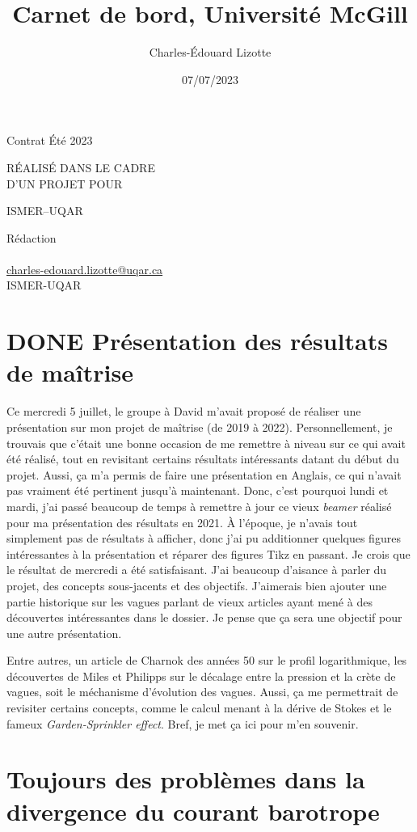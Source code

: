 \documentclass[10pt]{article}
\author{Charles-Édouard Lizotte}
\date{07/07/2023}
\title{Carnet de bord, Université McGill}
\makeatletter
\numberwithin{equation}{section}
\newcommand{\mytitlepage}{
\begin{titlepage}
\begin{center}
{\Large Contrat Été 2023 \par}
\vspace{2cm}
{\Large \MakeUppercase{\thetitle} \par}
\vspace{2cm}
RÉALISÉ DANS LE CADRE\\ D'UN PROJET POUR \par
\vspace{2cm}
{\Large ISMER--UQAR \par}
\vspace{2cm}
{\thedate}
\end{center}
\vfill
Rédaction \\
{\theauthor}\\
\url{charles-edouard.lizotte@uqar.ca}\\
ISMER-UQAR
\end{titlepage}
}
\makeatother
\begin{document}
\mytitlepage
\tableofcontents\newpage



\section{{\bfseries\sffamily DONE} Présentation des résultats de maîtrise}
\label{sec:org2043ec7}
Ce mercredi 5 juillet, le groupe à David m'avait proposé de réaliser une présentation sur mon projet de maîtrise (de 2019 à 2022).
Personnellement, je trouvais que c'était une bonne occasion de me remettre à niveau sur ce qui avait été réalisé, tout en revisitant certains résultats intéressants datant du début du projet.
Aussi, ça m'a permis de faire une présentation en Anglais, ce qui n'avait pas vraiment été pertinent jusqu'à maintenant.
Donc, c'est pourquoi lundi et mardi, j'ai passé beaucoup de temps à remettre à jour ce vieux \emph{beamer} réalisé pour ma présentation des résultats en 2021.
À l'époque, je n'avais tout simplement pas de résultats à afficher, donc j'ai pu additionner quelques figures intéressantes à la présentation et réparer des figures Tikz en passant.
Je crois que le résultat de mercredi a été satisfaisant.
J'ai beaucoup d'aisance à parler du projet, des concepts sous-jacents et des objectifs.
J'aimerais bien ajouter une partie historique sur les vagues parlant de vieux articles ayant mené à des découvertes intéressantes dans le dossier.
Je pense que ça sera une objectif pour une autre présentation.\bigskip

Entre autres, un article de Charnok des années 50 sur le profil logarithmique, les découvertes de Miles et Philipps sur le décalage entre la pression et la crète de vagues, soit le méchanisme d'évolution des vagues.
Aussi, ça me permettrait de revisiter certains concepts, comme le calcul menant à la dérive de Stokes et le fameux \emph{Garden-Sprinkler effect}.
Bref, je met ça ici pour m'en souvenir.

\section{Toujours des problèmes dans la divergence du courant barotrope}
\label{sec:orge772fb6}
\end{document}
